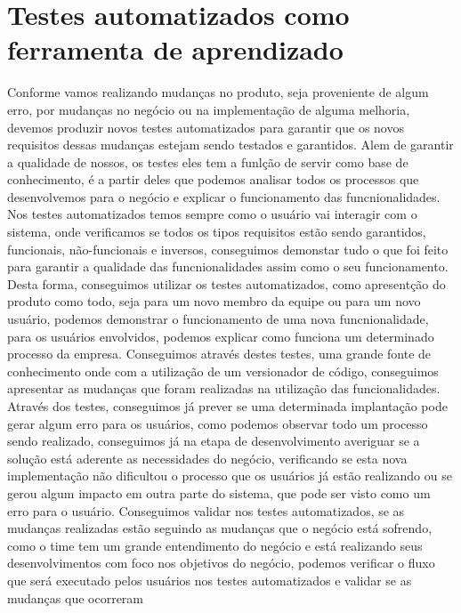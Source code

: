     \section{Testes automatizados como ferramenta de aprendizado}
      Conforme vamos realizando mudanças no produto, seja proveniente de algum erro,
      por mudanças no negócio ou na implementação de alguma melhoria, devemos produzir
      novos testes automatizados para garantir que os novos requisitos dessas mudanças
      estejam sendo testados e garantidos. \newline
      Alem de garantir a qualidade de nossos, os testes eles tem a funlção de servir
      como base de conhecimento, é a partir deles que podemos analisar todos os
      processos que desenvolvemos para o negócio e explicar o funcionamento das
      funcnionalidades. Nos testes automatizados temos sempre como o usuário vai
      interagir com o sistema, onde verificamos se todos os tipos requisitos estão
      sendo garantidos, funcionais, não-funcionais e inversos, conseguimos demonstar
      tudo o que foi feito para garantir a qualidade das funcnionalidades assim
      como o seu funcionamento. Desta forma, conseguimos utilizar os testes automatizados,
      como apresentção do produto como todo, seja para um novo membro da equipe ou
      para um novo usuário, podemos demonstrar o funcionamento de uma nova funcnionalidade,
      para os usuários envolvidos, podemos explicar como funciona um determinado
      processo da empresa. Conseguimos através destes testes, uma grande fonte de
      conhecimento onde com a utilização de um versionador de código, conseguimos
      apresentar as mudanças que foram realizadas na utilização das funcionalidades.
      Através dos testes, conseguimos já prever se uma determinada implantação pode
      gerar algum erro para os usuários, como podemos observar todo um processo sendo
      realizado, conseguimos já na etapa de desenvolvimento averiguar se a solução
      está aderente as necessidades do negócio, verificando se esta nova implementação
      não dificultou o processo que os usuários já estão realizando ou se gerou algum
      impacto em outra parte do sistema, que pode ser visto como um erro para o
      usuário. Conseguimos validar nos testes automatizados, se as mudanças realizadas
      estão seguindo as mudanças que o negócio está sofrendo, como o time tem um
      grande entendimento do negócio e está realizando seus desenvolvimentos com
      foco nos objetivos do negócio, podemos verificar o fluxo que será executado
      pelos usuários nos testes automatizados e validar se as mudanças que ocorreram
